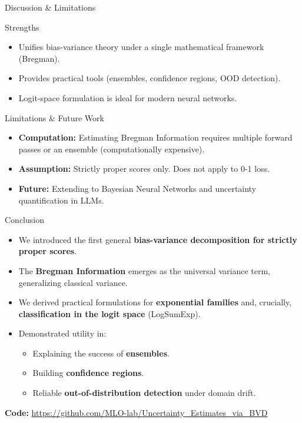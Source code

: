 \documentclass[aspectratio=169, 10pt]{beamer}
\begin{document}
\begin{frame}{Discussion \& Limitations}
    \begin{block}{Strengths}
        \begin{itemize}
            \item Unifies bias-variance theory under a single mathematical framework (Bregman).
            \item Provides practical tools (ensembles, confidence regions, OOD detection).
            \item Logit-space formulation is ideal for modern neural networks.
        \end{itemize}
    \end{block}
    \begin{block}{Limitations \& Future Work}
        \begin{itemize}
            \item \textbf{Computation:} Estimating Bregman Information requires multiple forward passes or an ensemble (computationally expensive).
            \item \textbf{Assumption:} Strictly proper scores only. Does not apply to 0-1 loss.
            \item \textbf{Future:} Extending to Bayesian Neural Networks and uncertainty quantification in LLMs.
        \end{itemize}
    \end{block}
\end{frame}

\begin{frame}{Conclusion}
    \begin{itemize}
        \item We introduced the first general \textbf{bias-variance decomposition for strictly proper scores}.
        \item The \textbf{Bregman Information} emerges as the universal variance term, generalizing classical variance.
        \item We derived practical formulations for \textbf{exponential families} and, crucially, \textbf{classification in the logit space} (LogSumExp).
        \item Demonstrated utility in:
        \begin{itemize}
            \item Explaining the success of \textbf{ensembles}.
            \item Building \textbf{confidence regions}.
            \item Reliable \textbf{out-of-distribution detection} under domain drift.
        \end{itemize}
    \end{itemize}
    \vfill
    \centering
    \textbf{Code:} \url{https://github.com/MLO-lab/Uncertainty_Estimates_via_BVD}
\end{frame}
\end{document}
